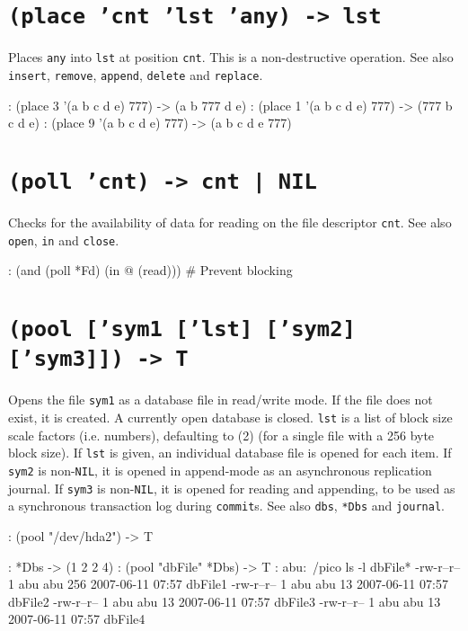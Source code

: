  
\section*{\texttt{(place 'cnt 'lst 'any) -> lst}}
\label{sec:func-ref-P-(place 'cnt 'lst 'any) -> lst}


Places \texttt{any} into \texttt{lst} at position \texttt{cnt}. This is a non-destructive
operation. See also \texttt{insert}, \texttt{remove}, \texttt{append}, \texttt{delete} and
\texttt{replace}.


\begin{wideverbatim}
: (place 3 '(a b c d e) 777)
-> (a b 777 d e)
: (place 1 '(a b c d e) 777)
-> (777 b c d e)
: (place 9 '(a b c d e) 777)
-> (a b c d e 777)
\end{wideverbatim}

 
\section*{\texttt{(poll 'cnt) -> cnt | NIL}}
\label{sec:func-ref-P-(poll 'cnt) -> cnt | NIL}


Checks for the availability of data for reading on the file descriptor
\texttt{cnt}. See also \texttt{open}, \texttt{in} and \texttt{close}.


\begin{wideverbatim}
: (and (poll *Fd) (in @ (read)))  # Prevent blocking
\end{wideverbatim}

 
\section*{\texttt{(pool ['sym1 ['lst] ['sym2] ['sym3]]) -> T}}
\label{sec:func-ref-P-(pool ['sym1 ['lst] ['sym2] ['sym3]]) -> T}


Opens the file \texttt{sym1} as a database file in read/write mode. If the file
does not exist, it is created. A currently open database is closed.
\texttt{lst} is a list of block size scale factors (i.e. numbers), defaulting
to (2) (for a single file with a 256 byte block size). If \texttt{lst} is
given, an individual database file is opened for each item. If \texttt{sym2} is
non-\texttt{NIL}, it is opened in append-mode as an asynchronous replication
journal. If \texttt{sym3} is non-\texttt{NIL}, it is opened for reading and appending,
to be used as a synchronous transaction log during \texttt{commit}s. See also \texttt{dbs}, \texttt{*Dbs} and \texttt{journal}.


\begin{wideverbatim}
: (pool "/dev/hda2")
-> T

: *Dbs
-> (1 2 2 4)
: (pool "dbFile" *Dbs)
-> T
:
abu:~/pico  ls -l dbFile*
-rw-r--r-- 1 abu abu 256 2007-06-11 07:57 dbFile1
-rw-r--r-- 1 abu abu  13 2007-06-11 07:57 dbFile2
-rw-r--r-- 1 abu abu  13 2007-06-11 07:57 dbFile3
-rw-r--r-- 1 abu abu  13 2007-06-11 07:57 dbFile4
\end{wideverbatim}

